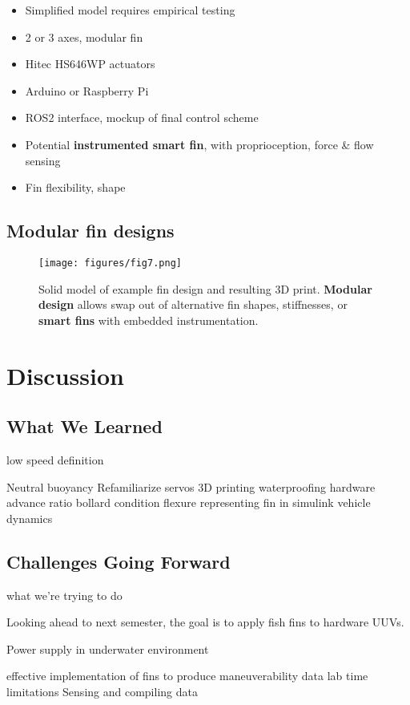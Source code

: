 \documentclass[twocolumn,10pt]{IEEEtran}
\begin{document}
\begin{itemize}
\item Simplified model requires empirical testing
\item 2 or 3 axes, modular fin
\item Hitec HS646WP actuators
\item Arduino or Raspberry Pi
\item ROS2 interface, mockup of final control scheme
\item Potential \textbf{instrumented smart fin}, with proprioception, force \& flow sensing
\item Fin flexibility, shape
\end{itemize}

\subsection{Modular fin designs}
\begin{figure}
\begin{center}
\texttt{[image: figures/fig7.png]}
\end{center}
\caption{Solid model of example fin design and resulting 3D print. \textbf{Modular design} allows swap out of alternative fin shapes, stiffnesses, or \textbf{smart fins} with embedded instrumentation.}
\end{figure}

\section{Discussion}
\subsection{What We Learned}
low speed definition

Neutral buoyancy
Refamiliarize servos
3D printing
waterproofing hardware
advance ratio
bollard condition
flexure
representing fin in simulink
vehicle dynamics


\subsection{Challenges Going Forward}
what we're trying to do

Looking ahead to next semester, the goal is to apply fish fins to hardware UUVs.  

Power supply in underwater environment

effective implementation of fins to produce maneuverability data
lab time limitations
Sensing and compiling data
\end{document}
